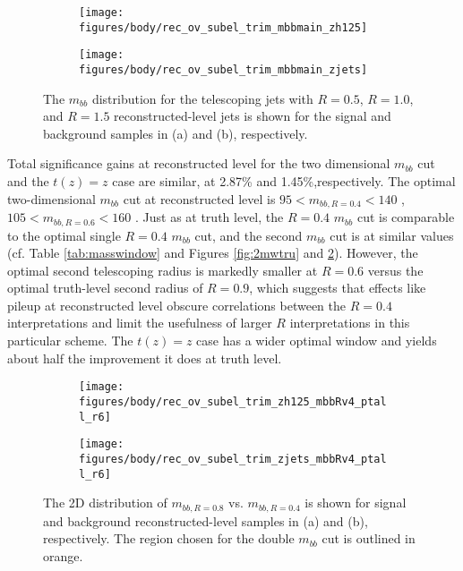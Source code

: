 \begin{figure}[!htbp]\captionsetup{justification=centering}
\begin{center}
\begin{subfigure}[t]{0.49\textwidth}\centering\texttt{[image: figures/body/rec\_ov\_subel\_trim\_mbbmain\_zh125]}\caption{}\end{subfigure}
\begin{subfigure}[t]{0.49\textwidth}\centering\texttt{[image: figures/body/rec\_ov\_subel\_trim\_mbbmain\_zjets]}\caption{}\end{subfigure}
\caption{\label{fig:multradrec}The $m_{bb}$ distribution for the telescoping jets with $R=0.5$, $R=1.0$, and $R=1.5$ reconstructed-level jets is shown for the signal and background samples in (a) and (b), respectively.}
\end{center}
\end{figure}

Total significance gains at reconstructed level for the two dimensional $m_{bb}$ cut and the $t\left(z\right)=z$ case are similar, at 2.87\% and 1.45\%,respectively.  The optimal two-dimensional $m_{bb}$ cut at reconstructed level is $95<m_{bb,R=0.4}<140$ \GeV, $105<m_{bb,R=0.6}<160$ \GeV.  Just as at truth level, the $R=0.4$ $m_{bb}$ cut is comparable to the optimal single $R=0.4$ $m_{bb}$ cut, and the second $m_{bb}$ cut is at similar values (cf. Table \ref{tab:masswindow} and Figures \ref{fig:2mwtru} and \ref{fig:2mwrec}).  However, the optimal second telescoping radius is markedly smaller at $R=0.6$ versus the optimal truth-level second radius of $R=0.9$, which suggests that effects like pileup at reconstructed level obscure correlations between the $R=0.4$ interpretations and limit the usefulness of larger $R$ interpretations in this particular scheme. The $t\left(z\right)=z$ case has a wider optimal window and yields about half the improvement it does at truth level.%

\begin{figure}[!htbp]\captionsetup{justification=centering}
\begin{center}
\begin{subfigure}[t]{0.49\textwidth}\centering\texttt{[image: figures/body/rec\_ov\_subel\_trim\_zh125\_mbbRv4\_ptall\_r6]}\caption{}\end{subfigure}
\begin{subfigure}[t]{0.49\textwidth}\centering\texttt{[image: figures/body/rec\_ov\_subel\_trim\_zjets\_mbbRv4\_ptall\_r6]}\caption{}\end{subfigure}
\caption{\label{fig:2mwrec}The 2D distribution of $m_{bb,R=0.8}$ vs. $m_{bb,R=0.4}$ is shown for signal and background reconstructed-level samples in (a) and (b), respectively.  The region chosen for the double $m_{bb}$ cut is outlined in orange.}
\end{center}
\end{figure}

